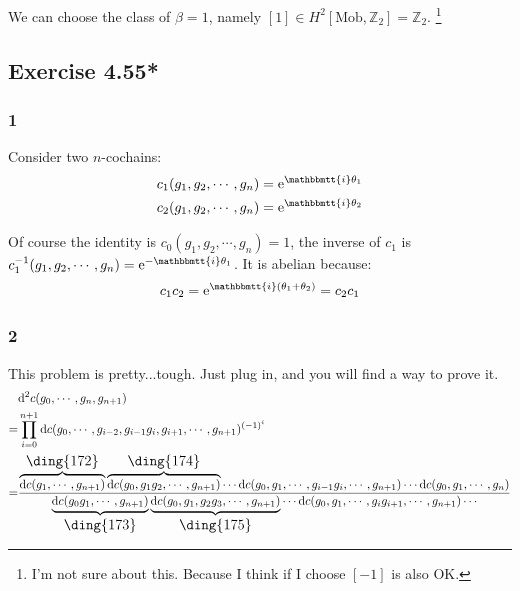 \documentclass[]{ctexart}
\newcommand{\mi}{\mathbbmtt{i}}
\newcommand{\di}{\mathrm{d}}
\newcommand{\me}{\mathrm{e}}
\newcommand{\td}[1]{\text{\large \ding{#1}}}
\begin{document}
		\subsubsection{}
			We can choose the class of $\beta=1$, namely $[1]\in H^2 [\text{Mob},\mathbb{Z}_2]=\mathbb{Z}_2$. 
			\footnote{I'm not sure about this. Because I think if I choose $[-1]$ is also OK. }
	\subsection{Exercise 4.55*}
		\subsubsection*{1}
			Consider two $n$-cochains:
				\begin{equation*}
				\begin{aligned}
					&c_1(g_1,g_2,\cdots,g_n)=\me^{\mi \theta_1}\\
					&c_2(g_1,g_2,\cdots,g_n)=\me^{\mi \theta_2}
				\end{aligned}
				\end{equation*}
		
			Of course the identity is $c_0(g_1,g_2,\cdots,g_n)=1$, the inverse of $c_1$ is $c_1^{-1}(g_1,g_2,\cdots,g_n)=\me^{-\mi \theta_1}$. It is abelian because:
				\begin{equation*}
				\begin{aligned}
					c_1c_2=\me^{\mi( \theta_1+\theta_{2})}=c_2c_1
				\end{aligned}
				\end{equation*}
				
		\subsubsection*{2}
			This problem is pretty...tough. Just plug in, and you will find a way to prove it.
			\begin{equation*}
			\begin{aligned}
			&\di ^2c(g_0,\cdots,g_n,g_{n+1})\\
			=&\prod_{i=0}^{n+1}\di c(g_0,\cdots,g_{i-2},g_{i-1}g_{i},g_{i+1},\cdots,g_{n+1})^{(-1)^i}\\
			=&\frac{\overbrace{\di c(g_1,\cdots,g_{n+1})}^{\td{172}}\overbrace{\di c(g_0,g_1g_2,\cdots,g_{n+1})}^{\td{174}}\cdots \di c(g_0,g_1,\cdots,g_{i-1}g_i,\cdots,g_{n+1})\cdots \di c(g_0,g_1,\cdots,g_{n})}{\underbrace{\di c(g_0g_1,\cdots,g_{n+1})}_{\td{173}}\underbrace{\di c(g_0,g_1,g_2g_3,\cdots,g_{n+1})}_{\td{175}}\cdots\di c(g_0,g_1,\cdots,g_{i}g_{i+1},\cdots,g_{n+1})\cdots}
			\end{aligned}
			\end{equation*}
			
\end{document}
